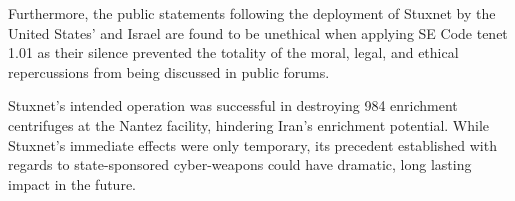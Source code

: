 \documentclass[12pt]{article}
\begin{document}
\begin{multicols}{2}
Furthermore, the public statements following the deployment of Stuxnet by the United States' and Israel are found to be unethical when applying SE Code tenet 1.01 as their silence prevented the totality of the moral, legal, and ethical repercussions from being discussed in public forums.

Stuxnet's intended operation was successful in destroying 984 enrichment centrifuges at the Nantez facility, hindering Iran's enrichment potential. While Stuxnet's immediate effects were only temporary,  its precedent established with regards to state-sponsored cyber-weapons could have dramatic, long lasting impact in the future.

\end{multicols}




\newpage

\end{document}
